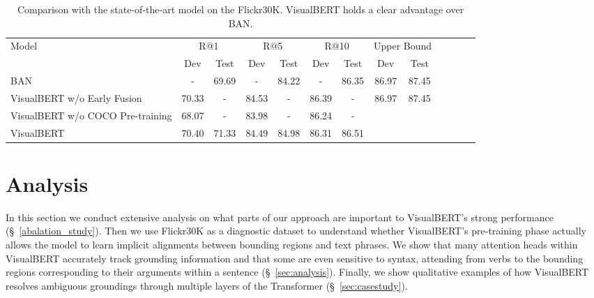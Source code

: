 \documentclass{article} \usepackage{iclr2019_conference,times}
\newcommand{\model}{VisualBERT\xspace}
\newcommand{\modelnp}{VisualBERT w/o COCO Pre-training\xspace}
\newcommand{\modelby}{VisualBERT w/o Early Fusion\xspace}
\newcommand{\modelp}{VisualBERT\xspace}
\begin{document}
\begin{table}[h]
\caption{Comparison with the state-of-the-art model on the Flickr30K. \model holds a clear advantage over BAN.}
\small
\label{sample-table}
\begin{center}
\begin{tabular}{@{}l@{ }|@{ }ccccccccccc@{ }c@{}}
\toprule
\multirow{2}{*}{Model} & \multicolumn{2}{c}{R@1} & \multicolumn{2}{c}{R@5} & \multicolumn{2}{c}{R@10} & \multicolumn{2}{c}{Upper Bound} \\ 

 & Dev & Test & Dev & Test & Dev & Test & Dev & Test \\ 

\midrule

BAN~\citep{kim2018bilinear} & - & 69.69  & - & 84.22 & - & 86.35 & 86.97 & 87.45 \\

\midrule

\modelby & 70.33 & - & 84.53 & - &  86.39 & - & \multirow{3}{*}{86.97} & \multirow{3}{*}{87.45}\\


\modelnp & 68.07 & - & 83.98 & - & 86.24 & -  \\
\modelp & 70.40 & 71.33 & 84.49 & 84.98 & 86.31 & 86.51  \\

\bottomrule
\end{tabular}
\end{center}
\label{table:flickr}
\end{table}
%
 
\section{Analysis}
In this section we conduct extensive analysis on what parts of our approach are important to \model's strong performance (\S~\ref{abalation_study}). 
Then we use Flickr30K as a diagnostic dataset to understand whether \model's pre-training phase actually allows the model to learn implicit alignments between bounding regions and text phrases. 
We show that many attention heads within \model accurately track grounding information and that some are even sensitive to syntax, attending from verbs to the bounding regions corresponding to their arguments within a sentence (\S~\ref{sec:analysis}).
Finally, we show qualitative examples of how \model resolves ambiguous groundings through multiple layers of the Transformer (\S~\ref{sec:casestudy}).
\end{document}

